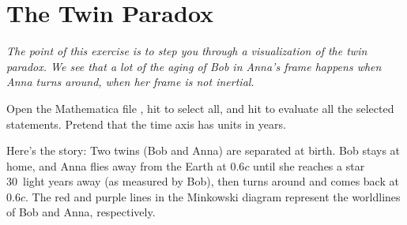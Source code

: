 \section{The Twin Paradox}



\makelabheader %

\bigskip

\textit{The point of this exercise is to step you through a visualization of the twin paradox.  We see that a lot of the aging of Bob in Anna's frame happens when Anna turns around, when her frame is not inertial.}

Open the Mathematica file , hit  to select all, and hit  to evaluate all the selected statements.  Pretend that the time axis has units in years.

Here's the story: Two twins (Bob and Anna) are separated at birth. Bob stays at home, and Anna flies away from the Earth at $0.6c$ until she reaches a star 30~light years away (as measured by Bob), then turns around and comes back at $0.6c$. The red and purple lines in the Minkowski diagram represent the worldlines of Bob and Anna, respectively.

